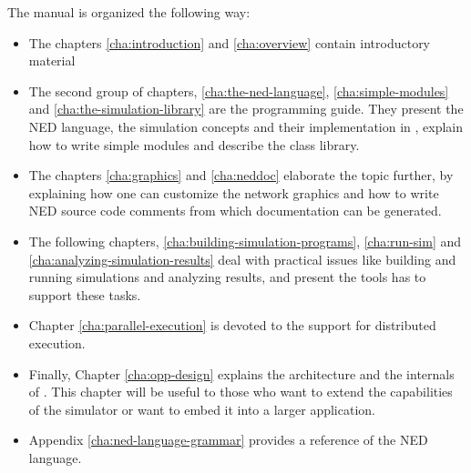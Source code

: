 The manual is organized the following way:

\begin{itemize}
  \item{The chapters
    \ref{cha:introduction} and
    \ref{cha:overview}
    contain introductory material}
  \item{The second group of chapters,
    \ref{cha:the-ned-language},
    \ref{cha:simple-modules} and
    \ref{cha:the-simulation-library}
    are the programming guide. They present the NED language,
    the simulation concepts and their implementation in {\opp}, explain
    how to write simple modules and describe the class library.}
  \item{The chapters
    \ref{cha:graphics} and
    \ref{cha:neddoc}
    elaborate the topic further, by explaining how one can customize
    the network graphics and how to write NED source code comments
    from which documentation can be generated.}
  \item{The following chapters,
    \ref{cha:building-simulation-programs},
    \ref{cha:run-sim} and
    \ref{cha:analyzing-simulation-results} deal with practical issues
    like building and running simulations and analyzing results, and
    present the tools {\opp} has to support these tasks.}
  \item{Chapter \ref{cha:parallel-execution} is devoted to the support
    for distributed execution.}
  \item{Finally, Chapter \ref{cha:opp-design} explains the
    architecture and the internals of {\opp}. This chapter will be
    useful to those who want to extend the capabilities of the
    simulator or want to embed it into a larger application.}
  \item{Appendix \ref{cha:ned-language-grammar} provides a reference
    of the NED language.}
\end{itemize}




